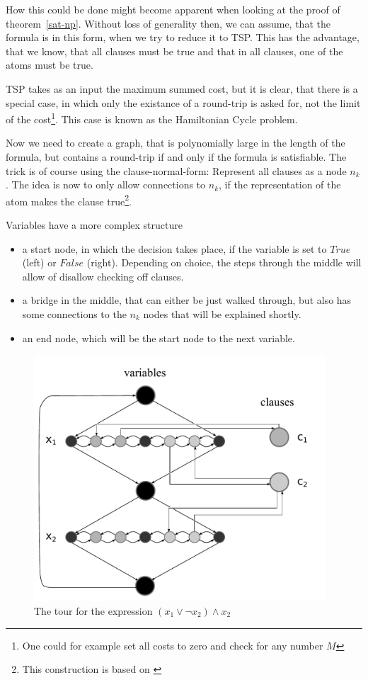 How this could be done might become apparent when looking at the proof of
theorem~\ref{sat-np}. Without loss of generality then, we can assume, that 
the formula is in this form, when we try to reduce it to TSP. This has the 
advantage, that we know, that all clauses must be true and that in all 
clauses, one of the atoms must be true.

TSP takes as an input the maximum summed cost, but it is clear, that there is 
a special case, in which only the existance of a round-trip is asked for, not 
the limit of the cost\footnote{One could for example set all costs to zero 
and check for any number $M$}. This case is known as the Hamiltonian Cycle problem.

Now we need to create a graph, that is polynomially large in the length of 
the formula, but contains a round-trip if and only if the formula is 
satisfiable. The trick is of course using the clause-normal-form: Represent 
all clauses as a node $n_k$. The idea is now to only allow connections to 
$n_k$, if the representation of the atom makes the clause true\footnote{This 
construction is based on \cite[p. 286-291]{sipser2006introduction}}.

Variables have a more complex structure

\begin{itemize}
	\item a start node, in which the decision takes place, if the variable is 
		set to $True$ (left) or $False$ (right). Depending on choice, the steps 
		through the middle will allow of disallow checking off clauses.
	\item a bridge in the middle, that can either be just walked through, but 
		also has some connections to the $n_k$ nodes that will be explained shortly.
	\item an end node, which will be the start node to the next variable.
\end{itemize}

\begin{figure}[htb]
	\includegraphics[width=0.97\textwidth]{complexity/langcomplexity/pictures/satastsp}
	\caption{The tour for the expression $(x_1\vee\lnot x_2)\wedge x_2$}
	
\end{figure}

